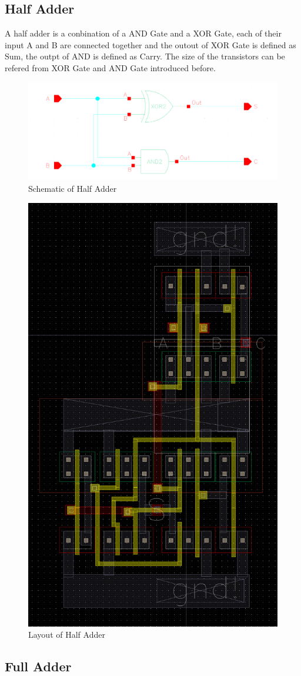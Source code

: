 \documentclass[conference]{IEEEtran}
\begin{document}
\subsection{Half Adder}


A half adder is a conbination of a AND Gate and a XOR Gate, each of their input A and B are connected together and the outout of XOR Gate is defined as Sum, the outpt of AND is defined as Carry. The size of the transistors can be refered from XOR Gate and AND Gate introduced before.

\begin{figure}[H]
    \centering
    \includegraphics[width = 0.9\linewidth]{half_adder_schematic.png}
    \caption{Schematic of Half Adder}
    \label{Schematic of Half Adder}
\end{figure}

\begin{figure}[H]
    \centering
    \includegraphics[width = 0.3\linewidth]{half_adder_layout.png}
    \caption{Layout of Half Adder}
    \label{Layout of Half Adder}
\end{figure}
  
\subsection{Full Adder}
\end{document}
